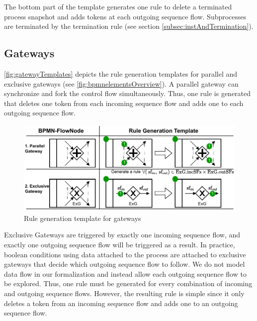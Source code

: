 \documentclass{lmcs} %
\begin{document}
The bottom part of the template generates one rule to delete a terminated process snapshot and adds tokens at each outgoing sequence flow.
Subprocesses are terminated by the termination rule (see section \ref{subsec:instAndTermination}).


\subsection{Gateways}
\autoref{fig:gatewayTemplates} depicts the rule generation templates for parallel and exclusive gateways (see \autoref{fig:bpmnelementsOverview}).
A parallel gateway can synchronize and fork the control flow simultaneously.
Thus, one rule is generated that deletes one token from each incoming sequence flow and adds one to each outgoing sequence flow.

\begin{figure}[ht]
    \centering
    \includegraphics[width=1\textwidth]{images/gateways_template.pdf}
    \caption{Rule generation template for gateways}
    \label{fig:gatewayTemplates}
\end{figure}

Exclusive Gateways are triggered by exactly one incoming sequence flow, and exactly one outgoing sequence flow will be triggered as a result.
In practice, boolean conditions using data attached to the process are attached to exclusive gateways that decide which outgoing sequence flow to follow.
We do not model data flow in our formalization and instead allow each outgoing sequence flow to be explored. 
Thus, one rule must be generated for every combination of incoming and outgoing sequence flows.
However, the resulting rule is simple since it only deletes a token from an incoming sequence flow and adds one to an outgoing sequence flow.
\end{document}
